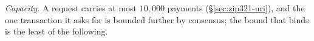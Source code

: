\documentclass[11pt,a4paper]{article}
\theoremstyle{definition}
\begin{document}
\emph{Capacity.} A request carries at most $10{,}000$ payments
(\S\ref{sec:zip321-uri}), and the one transaction it asks for is bounded
further by consensus; the bound that binds is the least of the following.
\end{document}
